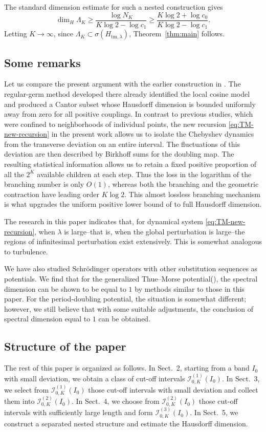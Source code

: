 \documentclass{amsart}
\theoremstyle{definition}
\begin{document}
The standard dimension estimate for such a nested construction gives
\[
    \dim_H\Lambda_K
    \geq
    \frac{\log N_K}
         {K\log2-\log c_1}\ge \frac{K\log2+\log c_0}{K\log2-\log c_1}.
\]
Letting $K\to\infty$, since $\Lambda_K\subset\sigma(H_{\mathrm{tm},\lambda})$,
Theorem~\ref{thm:main} follows.

\subsection{Some remarks}
Let us compare the present argument with the earlier
construction in \cite{LQ15}. The regular-germ method developed there
already identified the local cosine model and produced a Cantor subset
whose Hausdorff dimension is bounded uniformly away from zero for all
positive couplings. 
In contrast to previous studies, which were confined to neighborhoods of individual points, 
the new recursion \eqref{eq:TM-new-recursion} in the present work 
allows us to isolate the Chebyshev dynamics from the transverse deviation on an entire interval.
The fluctuations of
this deviation are then described by Birkhoff sums for the doubling
map. The resulting statistical information allows us to retain a fixed
positive proportion of all the \(2^K\) available children at each
 step. Thus the loss in the logarithm of the
branching number is only \(O(1)\), whereas both the branching and the
geometric contraction have leading order \(K\log2\). This almost
lossless branching mechanism is what upgrades the uniform positive
lower bound of \cite{LQ15} to full Hausdorff dimension.

The research in this paper indicates that, for dynamical system \eqref{eq:TM-new-recursion}, 
when $\lambda$ is large--that is, when the global perturbation is large--the regions 
of infinitesimal perturbation exist extensively. 
This is somewhat analogous to turbulence.

We have also studied Schr\"odinger operators with other substitution sequences as potentials. 
We find that for the generalized Thue–Morse potential(\cite{LT23}), 
the spectral dimension can be shown to be equal to $1$ 
by methods similar to those in this paper. 
For the period-doubling potential, the situation is somewhat different; 
however, we still believe that with some suitable adjustments, 
the conclusion of spectral dimension equal to $1$ can be obtained.

\subsection{Structure of the paper}
The rest of this paper is organized as follows. In Sect.~2, starting from a band \(I_0\) with small deviation, we obtain a class of cut-off intervals \(\mathcal{I}_{0,K}^{(1)}(I_0)\). In Sect.~3, we select from \(\mathcal{I}_{0,K}^{(1)}(I_0)\) those cut-off intervals with small deviation and collect them into \(\mathcal{I}_{0,K}^{(2)}(I_0)\). In Sect.~4, we choose from \(\mathcal{I}_{0,K}^{(2)}(I_0)\) those cut-off intervals with sufficiently large length and form \(\mathcal{I}_{0,K}^{(3)}(I_0)\). In Sect.~5, we construct a separated nested structure and estimate the Hausdorff dimension.
\end{document}
